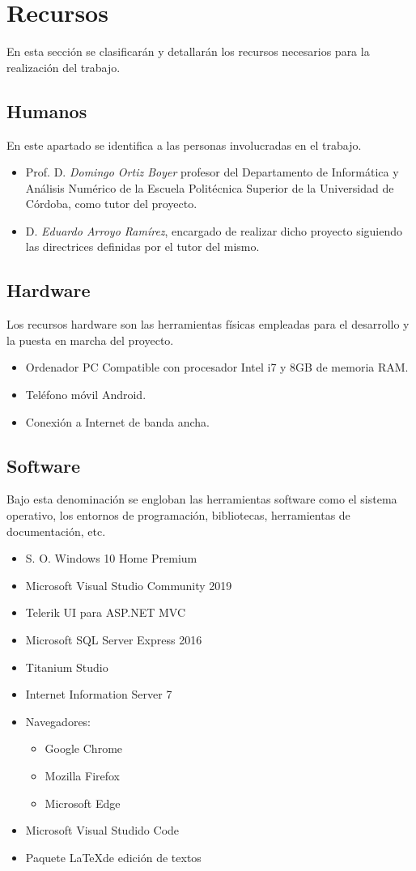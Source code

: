 \chapter{Recursos}
En esta sección se clasificarán y detallarán los recursos necesarios para la realización del trabajo.

\section{Humanos}
En este apartado se identifica a las personas involucradas en el trabajo.
\begin{itemize}
    \item Prof. D. \emph{Domingo Ortiz Boyer} profesor del Departamento de Informática y Análisis Numérico de la Escuela Politécnica Superior de la Universidad de Córdoba, como tutor del proyecto.
    \item D. \emph{Eduardo Arroyo Ramírez}, encargado de realizar dicho proyecto siguiendo las directrices definidas por el tutor del mismo.
\end{itemize}

\section{Hardware}
Los recursos hardware son las herramientas físicas empleadas para el desarrollo y la puesta en marcha del proyecto.
\begin{itemize}
    \item Ordenador PC Compatible con procesador Intel i7 y 8GB de memoria RAM.
    \item Teléfono móvil Android.
    \item Conexión a Internet de banda ancha.
\end{itemize}

\section{Software}
Bajo esta denominación se engloban las herramientas software como el sistema operativo, los entornos de programación, bibliotecas, herramientas de documentación, etc.
\begin{itemize}
    \item S. O. Windows 10 Home Premium
    \item Microsoft Visual Studio Community 2019
    \item Telerik UI para ASP.NET MVC
    \item Microsoft SQL Server Express 2016
    \item Titanium Studio
    \item Internet Information Server 7
    \item Navegadores:
    \begin{itemize}
        \item Google Chrome
        \item Mozilla Firefox
        \item Microsoft Edge
    \end{itemize}
    \item Microsoft Visual Studido Code
    \item Paquete \LaTeX de edición de textos
\end{itemize}